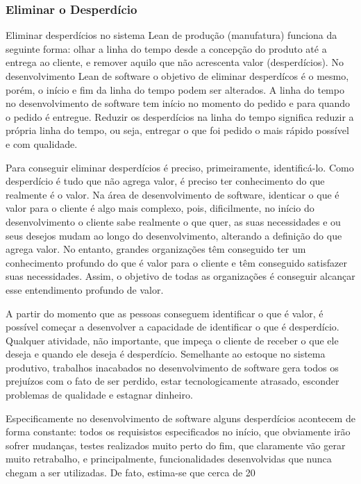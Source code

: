 \subsubsection[Eliminar o Desperdício]{Eliminar o Desperdício}

Eliminar desperdícios no sistema Lean de produção (manufatura) funciona da seguinte forma: olhar a linha do tempo desde a concepção do produto até a entrega ao cliente, e remover aquilo que não acrescenta valor (desperdícios). No desenvolvimento Lean de software o objetivo de eliminar desperdícos é o mesmo, porém, o início e  fim da linha do tempo podem ser alterados. A linha do tempo no desenvolvimento de software tem início no momento do pedido e para quando o pedido é entregue. Reduzir os desperdícios na linha do tempo significa reduzir a própria linha do tempo, ou seja, entregar o que foi pedido o mais rápido possível e com qualidade.

Para conseguir eliminar desperdícios é preciso, primeiramente, identificá-lo. Como desperdício é tudo que não agrega valor, é preciso ter conhecimento do que realmente é o valor. Na área de desenvolvimento de software, identicar o que é valor para o cliente é algo mais complexo, pois, dificilmente, no início do desenvolvimento o cliente sabe realmente o que quer, as suas necessidades e ou seus desejos mudam ao longo do desenvolvimento, alterando a definição do que agrega valor. No entanto, grandes organizações têm conseguido ter um conhecimento profundo do que é valor para o cliente e têm conseguido satisfazer suas necessidades. Assim, o objetivo de todas as organizações é conseguir alcançar esse entendimento profundo de valor.

A partir do momento que as pessoas conseguem identificar o que é valor, é possível começar a desenvolver a capacidade de identificar o que é desperdício. Qualquer atividade, não importante, que impeça o cliente de receber o que ele deseja e quando ele deseja é desperdício. Semelhante ao estoque no sistema produtivo, trabalhos inacabados no desenvolvimento de software gera todos os prejuízos com o fato de ser perdido, estar tecnologicamente atrasado, esconder problemas de qualidade e estagnar dinheiro.

Especificamente no desenvolvimento de software alguns desperdícios acontecem de forma constante: todos os requisistos especificados no início, que obviamente irão sofrer mudanças, testes realizados muito perto do fim, que claramente vão gerar muito retrabalho, e principalmente, funcionalidades desenvolvidas que nunca chegam a ser utilizadas.  De fato, estima-se que cerca de 20%

